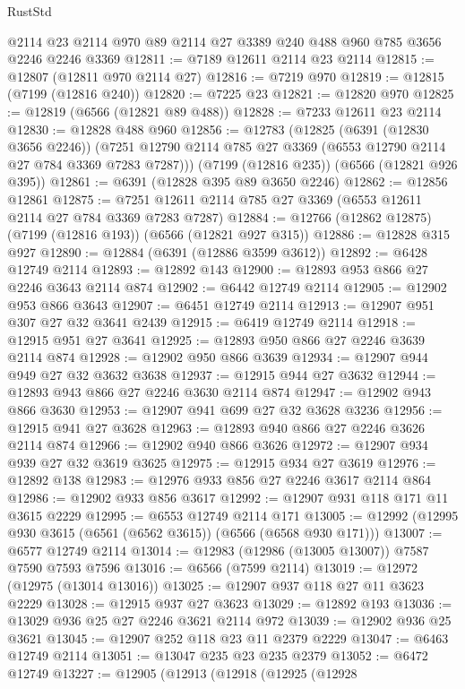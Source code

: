\begin{lexlean}{RustStd}
\begin{coremodule}
{\begin{coremodule}
{{{{{{{{{{{{{{{{{{{{{{{{{{    @2114
    @23
    @2114
    @970
    @89
    @2114
    @27
    @3389
    @240
    @488
    @960
    @785
    @3656
    @2246
    @2246
    @3369
@12811 := @7189 @12611 @2114 @23 @2114
@12815 := @12807 (@12811 @970 @2114 @27)
@12816 := @7219 @970
@12819 := @12815 (@7199 (@12816 @240))
@12820 := @7225 @23
@12821 := @12820 @970
@12825 := @12819 (@6566 (@12821 @89 @488))
@12828 := @7233 @12611 @23 @2114
@12830 := @12828 @488 @960
@12856 := @12783
    (@12825
      (@6391 (@12830 @3656 @2246))
      (@7251 @12790 @2114 @785 @27 @3369 (@6553 @12790 @2114 @27 @784 @3369 @7283 @7287)))
    (@7199 (@12816 @235))
    (@6566 (@12821 @926 @395))
@12861 := @6391 (@12828 @395 @89 @3650 @2246)
@12862 := @12856 @12861
@12875 := @7251 @12611 @2114 @785 @27 @3369 (@6553 @12611 @2114 @27 @784 @3369 @7283 @7287)
@12884 := @12766 (@12862 @12875) (@7199 (@12816 @193)) (@6566 (@12821 @927 @315))
@12886 := @12828 @315 @927
@12890 := @12884 (@6391 (@12886 @3599 @3612))
@12892 := @6428 @12749 @2114
@12893 := @12892 @143
@12900 := @12893 @953 @866 @27 @2246 @3643 @2114 @874
@12902 := @6442 @12749 @2114
@12905 := @12902 @953 @866 @3643
@12907 := @6451 @12749 @2114
@12913 := @12907 @951 @307 @27 @32 @3641 @2439
@12915 := @6419 @12749 @2114
@12918 := @12915 @951 @27 @3641
@12925 := @12893 @950 @866 @27 @2246 @3639 @2114 @874
@12928 := @12902 @950 @866 @3639
@12934 := @12907 @944 @949 @27 @32 @3632 @3638
@12937 := @12915 @944 @27 @3632
@12944 := @12893 @943 @866 @27 @2246 @3630 @2114 @874
@12947 := @12902 @943 @866 @3630
@12953 := @12907 @941 @699 @27 @32 @3628 @3236
@12956 := @12915 @941 @27 @3628
@12963 := @12893 @940 @866 @27 @2246 @3626 @2114 @874
@12966 := @12902 @940 @866 @3626
@12972 := @12907 @934 @939 @27 @32 @3619 @3625
@12975 := @12915 @934 @27 @3619
@12976 := @12892 @138
@12983 := @12976 @933 @856 @27 @2246 @3617 @2114 @864
@12986 := @12902 @933 @856 @3617
@12992 := @12907 @931 @118 @171 @11 @3615 @2229
@12995 := @6553 @12749 @2114 @171
@13005 := @12992 (@12995 @930 @3615 (@6561 (@6562 @3615)) (@6566 (@6568 @930 @171)))
@13007 := @6577 @12749 @2114
@13014 := @12983 (@12986 (@13005 @13007)) @7587 @7590 @7593 @7596
@13016 := @6566 (@7599 @2114)
@13019 := @12972 (@12975 (@13014 @13016))
@13025 := @12907 @937 @118 @27 @11 @3623 @2229
@13028 := @12915 @937 @27 @3623
@13029 := @12892 @193
@13036 := @13029 @936 @25 @27 @2246 @3621 @2114 @972
@13039 := @12902 @936 @25 @3621
@13045 := @12907 @252 @118 @23 @11 @2379 @2229
@13047 := @6463 @12749 @2114
@13051 := @13047 @235 @23 @235 @2379
@13052 := @6472 @12749
@13227 := @12905
    (@12913
      (@12918
        (@12925
          (@12928
}}}}}}}}}}}}}}}}}}}}}}}}}}
\end{coremodule}}
\end{coremodule}
\end{lexlean}
